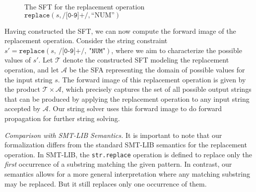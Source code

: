 \documentclass[sigplan,10pt,anonymous,review]{acmart}\settopmatter{printfolios=true,printccs=false,printacmref=false}
\begin{document}
\begin{figure}[h] \centering
  \caption{The SFT for the replacement operation \\ $\texttt{replace}(s, \texttt{/[0-9]+/}, \text{``NUM''})$}
  \label{fig-rearranged-automata}
  \end{figure}


  Having constructed the SFT, we can now compute the forward image of the replacement operation. Consider the string constraint $s' = \texttt{replace}(s,~\texttt{/[0-9]+/},~\text{"}\texttt{NUM}\text{"})$, where we aim to characterize the possible values of $s'$. Let $\mathcal{T}$ denote the constructed SFT modeling the replacement operation, and let $\mathcal{A}$ be the SFA representing the domain of possible values for the input string $s$. The forward image of this replacement operation is given by the product $\mathcal{T} \times \mathcal{A}$, which precisely captures the set of all possible output strings that can be produced by applying the replacement operation to any input string accepted by $\mathcal{A}$.
  Our string solver uses this forward image to do forward propagation for further string solving.

  \emph{Comparison with SMT-LIB Semantics.} It is important to note that our formalization differs from the standard SMT-LIB semantics for the replacement operation. In SMT-LIB, the \texttt{str.replace} operation is defined to replace only the \emph{first} occurrence of a substring matching the given pattern. In contrast, our semantics allows for a more general interpretation where any matching substring may be replaced. But it still replaces only one occurrence of them.
\end{document}
